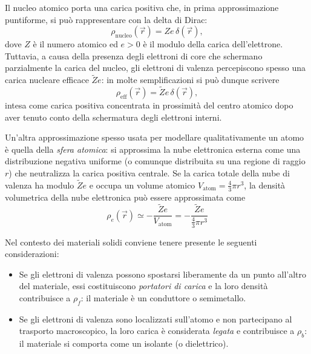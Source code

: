 \documentclass{book}
\begin{document}
Il nucleo atomico porta una carica positiva che, in prima approssimazione puntiforme, si può rappresentare con la delta di Dirac:
\[
\rho_{\mathrm{nucleo}}(\vec{r}) = Z e\,\delta(\vec{r}),
\]
dove $Z$ è il numero atomico ed $e>0$ è il modulo della carica dell'elettrone. Tuttavia, a causa della presenza degli elettroni di core che schermano parzialmente la carica del nucleo, gli elettroni di valenza percepiscono spesso una carica nucleare efficace $\tilde{Z}e$: in molte semplificazioni si può dunque scrivere
\[
\rho_{\mathrm{eff}}(\vec{r}) = \tilde{Z}e\,\delta(\vec{r}),
\]
intesa come carica positiva concentrata in prossimità del centro atomico dopo aver tenuto conto della schermatura degli elettroni interni.

Un'altra approssimazione spesso usata per modellare qualitativamente un atomo è quella della \emph{sfera atomica}: si approssima la nube elettronica esterna come una distribuzione negativa uniforme (o comunque distribuita su una regione di raggio $r$) che neutralizza la carica positiva centrale. Se la carica totale della nube di valenza ha modulo $\tilde{Z}e$ e occupa un volume atomico $V_{\mathrm{atom}}=\tfrac{4}{3}\pi r^3$, la densità volumetrica della nube elettronica può essere approssimata come
\[
\rho_{e}(\vec{r}) \simeq -\frac{\tilde{Z}e}{V_{\mathrm{atom}}} = -\frac{\tilde{Z}e}{\tfrac{4}{3}\pi r^3}
\]

Nel contesto dei materiali solidi conviene tenere presente le seguenti considerazioni:

\begin{itemize}
  \item Se gli elettroni di valenza possono spostarsi liberamente da un punto all'altro del materiale, essi costituiscono \emph{portatori di carica} e la loro densità contribuisce a $\rho_f$: il materiale è un conduttore o semimetallo.
  \item Se gli elettroni di valenza sono localizzati sull'atomo e non partecipano al trasporto macroscopico, la loro carica è considerata \emph{legata} e contribuisce a $\rho_b$: il materiale si comporta come un isolante (o dielettrico).
\end{itemize}
\end{document}
